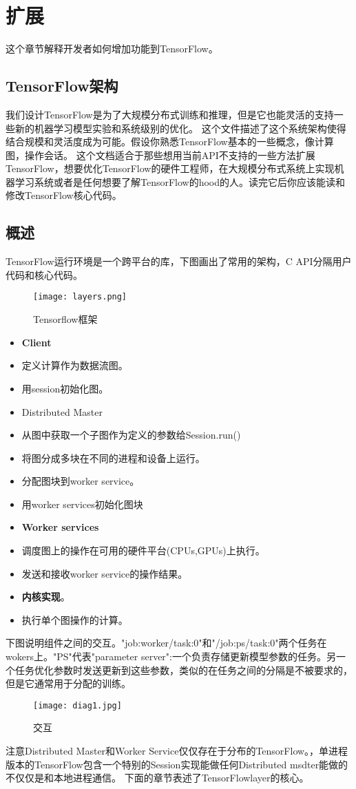 \chapter{扩展}
这个章节解释开发者如何增加功能到TensorFlow。
\section{TensorFlow架构}
我们设计TensorFlow是为了大规模分布式训练和推理，但是它也能灵活的支持一些新的机器学习模型实验和系统级别的优化。
这个文件描述了这个系统架构使得结合规模和灵活度成为可能。假设你熟悉TensorFlow基本的一些概念，像计算图，操作会话。
这个文档适合于那些想用当前API不支持的一些方法扩展TensorFlow，想要优化TensorFlow的硬件工程师，在大规模分布式系统上实现机器学习系统或者是任何想要了解TensorFlow的hood的人。读完它后你应该能读和修改TensorFlow核心代码。
\section{概述}
TensorFlow运行环境是一个跨平台的库，下图画出了常用的架构，C API分隔用户代码和核心代码。
\begin{center}
\begin{figure}[H]
\centering
\texttt{[image: layers.png]}
\caption{Tensorflow框架}
	\label{fig:tf_frame}
\end{figure}
\end{center}
\begin{itemize}
\item \textbf{Client}
\item 定义计算作为数据流图。
\item 用session初始化图。
\item Distributed Master
\item 从图中获取一个子图作为定义的参数给Session.run()
\item 将图分成多块在不同的进程和设备上运行。
\item 分配图块到worker service。
\item 用worker services初始化图块
\item \textbf{Worker services}
\item 调度图上的操作在可用的硬件平台(CPUs,GPUs)上执行。
\item 发送和接收worker service的操作结果。
\item \textbf{内核实现}。
\item 执行单个图操作的计算。
\end{itemize}
下图说明组件之间的交互。"job:worker/task:0"和"/job:ps/task:0"两个任务在wokers上。"PS"代表"parameter server":一个负责存储更新模型参数的任务。另一个任务优化参数时发送更新到这些参数，类似的在任务之间的分隔是不被要求的，但是它通常用于分配的训练。
\begin{figure}[H]
	\centering
	\texttt{[image: diag1.jpg]}
	\caption{交互}
	\label{fig:tf_ext2}
\end{figure}
注意Distributed Master和Worker Service仅仅存在于分布的TensorFlow。，单进程版本的TensorFlow包含一个特别的Session实现能做任何Distributed msdter能做的不仅仅是和本地进程通信。
下面的章节表述了TensorFlowlayer的核心。
